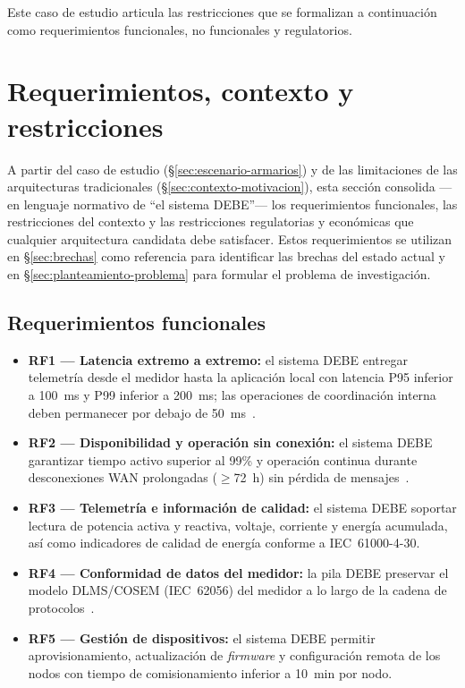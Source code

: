 

Este caso de estudio articula las restricciones que se formalizan a continuación como requerimientos funcionales, no funcionales y regulatorios.


\section{Requerimientos, contexto y restricciones}
\label{sec:requerimientos}

A partir del caso de estudio (§\ref{sec:escenario-armarios}) y de las limitaciones de las arquitecturas tradicionales (§\ref{sec:contexto-motivacion}), esta sección consolida ---en lenguaje normativo de ``el sistema DEBE''--- los requerimientos funcionales, las restricciones del contexto y las restricciones regulatorias y económicas que cualquier arquitectura candidata debe satisfacer. Estos requerimientos se utilizan en §\ref{sec:brechas} como referencia para identificar las brechas del estado actual y en §\ref{sec:planteamiento-problema} para formular el problema de investigación.

\subsection{Requerimientos funcionales}
\label{sec:req-funcionales}

\begin{itemize}
    \item \textbf{RF1 --- Latencia extremo a extremo:} el sistema DEBE entregar telemetría desde el medidor hasta la aplicación local con latencia P95 inferior a 100~ms y P99 inferior a 200~ms; las operaciones de coordinación interna deben permanecer por debajo de 50~ms~\cite{laghariInternetThingsIoT2024,IEEERecommendedPractice}.
    \item \textbf{RF2 --- Disponibilidad y operación sin conexión:} el sistema DEBE garantizar tiempo activo superior al 99\% y operación continua durante desconexiones WAN prolongadas ($\geq$72~h) sin pérdida de mensajes~\cite{NISTFramework2022}.
    \item \textbf{RF3 --- Telemetría e información de calidad:} el sistema DEBE soportar lectura de potencia activa y reactiva, voltaje, corriente y energía acumulada, así como indicadores de calidad de energía conforme a IEC~61000-4-30.
    \item \textbf{RF4 --- Conformidad de datos del medidor:} la pila DEBE preservar el modelo DLMS/COSEM (IEC~62056) del medidor a lo largo de la cadena de protocolos~\cite{dlmsCOSEMArchitecture2023}.
    \item \textbf{RF5 --- Gestión de dispositivos:} el sistema DEBE permitir aprovisionamiento, actualización de \emph{firmware} y configuración remota de los nodos con tiempo de comisionamiento inferior a 10~min por nodo.
\end{itemize}

